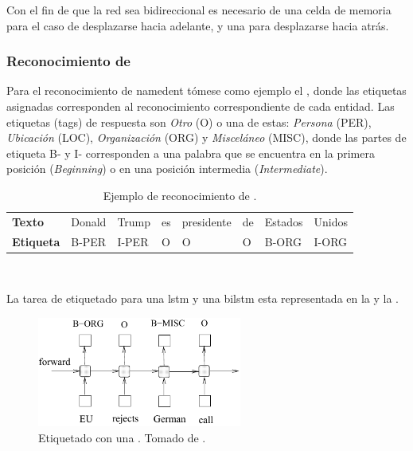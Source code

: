 Con el fin de que la red sea bidireccional es necesario de una celda de memoria para el caso de desplazarse hacia adelante, y una para desplazarse hacia atrás.

\subsubsection{Reconocimiento de }
Para el reconocimiento de \gls{namedent} tómese como ejemplo el , donde las etiquetas asignadas corresponden al reconocimiento correspondiente de cada entidad.
Las etiquetas (tags) de respuesta son \emph{Otro} (\textsc{O}) o una de estas: \emph{Persona} (\textsc{PER}), \emph{Ubicación} (\textsc{LOC}), \emph{Organización} (\textsc{ORG}) y \emph{Misceláneo} (\textsc{MISC}), donde las partes de etiqueta \textsc{B-} y \textsc{I-} corresponden a una palabra que se encuentra en la primera posición (\textsl{Beginning}) o en una posición intermedia (\textsl{Intermediate}).

\begin{table}[H]
  \centering
  \begin{tabular}{l|lllllll}
    \textbf{Texto}    & Donald   & Trump & es & presidente & de & Estados & Unidos \\
    \textbf{Etiqueta} & B-PER    & I-PER & O  & O          & O  & B-ORG   & I-ORG
  \end{tabular}
  \\ [1em]
  \decoRule
  \caption{Ejemplo de reconocimiento de .}
  \label{table:namedent-example}
\end{table}

La tarea de etiquetado para una \gls{lstm} y una \gls{bilstm} esta representada en la  y la .

\begin{figure}[H]
  \centering
  \includegraphics[width=0.6\textwidth]{Figures/lstm-arch.pdf}
\decoRule
\caption[Etiquetado con una ]{Etiquetado con una . Tomado de \cite{Huang2015}.}
\label{fig:lstm-arch}
\end{figure}

